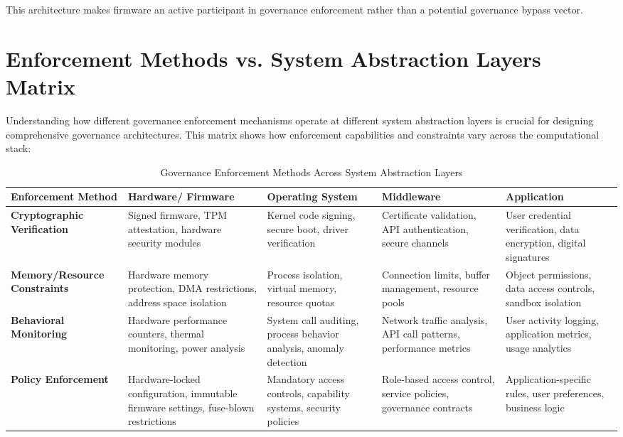 This architecture makes firmware an active participant in governance enforcement rather than a potential governance bypass vector.

\section{Enforcement Methods vs. System Abstraction Layers Matrix}

Understanding how different governance enforcement mechanisms operate at different system abstraction layers is crucial for designing comprehensive governance architectures. This matrix shows how enforcement capabilities and constraints vary across the computational stack:

\begin{table}[h]
\centering
\begin{tabular}{|p{3cm}|p{2.8cm}|p{2.8cm}|p{2.8cm}|p{2.8cm}|}
\hline
\textbf{Enforcement Method} & \textbf{Hardware/ Firmware} & \textbf{Operating System} & \textbf{Middleware} & \textbf{Application} \\
\hline
\textbf{Cryptographic Verification} & 
Signed firmware, TPM attestation, hardware security modules &
Kernel code signing, secure boot, driver verification &
Certificate validation, API authentication, secure channels &
User credential verification, data encryption, digital signatures \\
\hline
\textbf{Memory/Resource Constraints} &
Hardware memory protection, DMA restrictions, address space isolation &
Process isolation, virtual memory, resource quotas &
Connection limits, buffer management, resource pools &
Object permissions, data access controls, sandbox isolation \\
\hline
\textbf{Behavioral Monitoring} &
Hardware performance counters, thermal monitoring, power analysis &
System call auditing, process behavior analysis, anomaly detection &
Network traffic analysis, API call patterns, performance metrics &
User activity logging, application metrics, usage analytics \\
\hline
\textbf{Policy Enforcement} &
Hardware-locked configuration, immutable firmware settings, fuse-blown restrictions &
Mandatory access controls, capability systems, security policies &
Role-based access control, service policies, governance contracts &
Application-specific rules, user preferences, business logic \\
\hline
\end{tabular}
\caption{Governance Enforcement Methods Across System Abstraction Layers}
\label{tab:governance_enforcement_matrix2}
\end{table}

